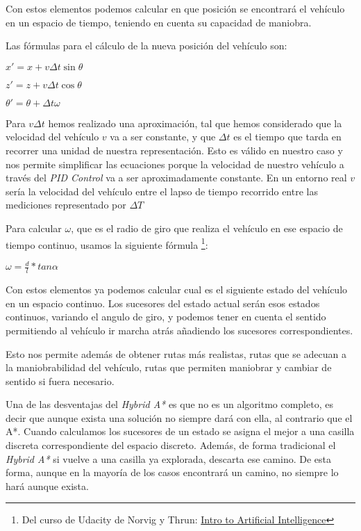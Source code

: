Con estos elementos podemos calcular en que posición se encontrará el vehículo en un espacio de tiempo, teniendo en cuenta su capacidad de maniobra.

Las fórmulas para el cálculo de la nueva posición del vehículo son:
\begin{center}
$x' = x +  v \Delta t \sin \theta$

$z' = z +  v \Delta t \cos \theta$

$\theta' = \theta + \Delta t \omega $
\end{center}

Para $v \Delta t$ hemos realizado una aproximación, tal que hemos considerado que la velocidad del vehículo $v$ va a ser constante, y que $\Delta t$ es el tiempo que tarda en recorrer una unidad de nuestra representación. Esto es válido en nuestro caso y nos permite simplificar las ecuaciones porque la velocidad de nuestro vehículo a través del \textit{PID Control} va a ser aproximadamente constante. En un entorno real $v$ sería la velocidad del vehículo entre el lapso de tiempo recorrido entre las mediciones representado por $\Delta T$ 

Para calcular $\omega$, que es el radio de giro que realiza el vehículo en ese espacio de tiempo continuo, usamos la siguiente fórmula
\footnote{Del curso de Udacity de Norvig y Thrun: \href{https://www.udacity.com/course/intro-to-artificial-intelligence--cs271}{Intro to Artificial Intelligence}}:
\begin{center}
$\omega = \displaystyle \frac{d}{l} * tan \alpha  $
\end{center}

Con estos elementos ya podemos calcular cual es el siguiente estado del vehículo en un espacio continuo. Los sucesores del estado actual serán esos estados continuos, variando el angulo de giro, y podemos tener en cuenta el sentido permitiendo al vehículo ir marcha atrás añadiendo los sucesores correspondientes.

Esto nos permite además de obtener rutas más realistas, rutas que se adecuan a la maniobrabilidad del vehículo,  rutas que permiten maniobrar y cambiar de sentido si fuera necesario.

Una de las desventajas del \textit{Hybrid A*} es que no es un algoritmo completo, es decir que aunque exista una solución no siempre dará con ella, al contrario que el A*. Cuando calculamos los sucesores de un estado se asigna el mejor a una casilla discreta correspondiente del espacio discreto. Además, de forma tradicional el \textit{Hybrid A*} si vuelve a una casilla ya explorada, descarta ese camino. De esta forma, aunque en la mayoría de los casos encontrará un camino, no siempre lo hará aunque exista.


